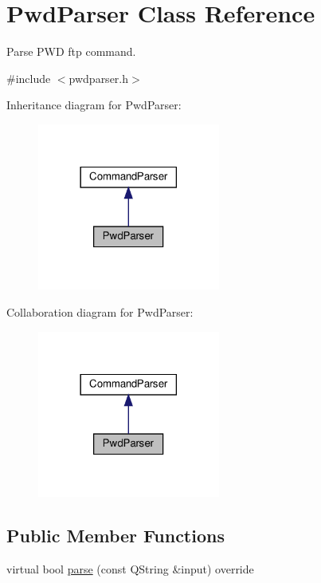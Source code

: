 \hypertarget{classPwdParser}{}\section{Pwd\+Parser Class Reference}
\label{classPwdParser}


Parse P\+WD ftp command.  




{\ttfamily \#include $<$pwdparser.\+h$>$}



Inheritance diagram for Pwd\+Parser\+:\nopagebreak
\begin{figure}[H]
\begin{center}
\leavevmode
\includegraphics[width=170pt]{d6/d2f/classPwdParser__inherit__graph}
\end{center}
\end{figure}


Collaboration diagram for Pwd\+Parser\+:\nopagebreak
\begin{figure}[H]
\begin{center}
\leavevmode
\includegraphics[width=170pt]{d0/df0/classPwdParser__coll__graph}
\end{center}
\end{figure}
\subsection*{Public Member Functions}
\begin{DoxyCompactItemize}
\item 
virtual bool \hyperlink{classPwdParser_a2eb9149ae412e0d3a1b4b8f70f037224}{parse} (const Q\+String \&input) override
\end{DoxyCompactItemize}


